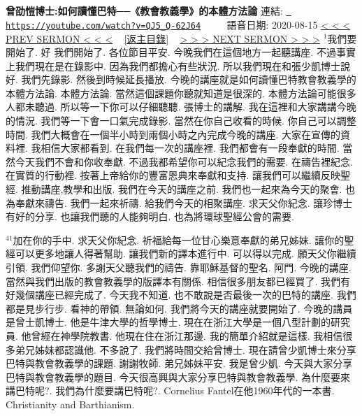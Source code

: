 \documentclass{book}
\begin{document}
\section{}
\label{sec:QJ5_Q_62J64}
\textbf{曾劭愷博士:如何讀懂巴特──《教會教義學》的本體方法論}
\newline
\newline
連結: \href{https://youtube.com/watch?v=QJ5_Q-62J64}{\texttt{ https://youtube.com/watch?v=QJ5\_Q-62J64}} ~~~~ 語音日期: 2020-08-15 
\newline
\newline
\hyperref[sec:f7PBJM5qt9k]{\small{< < < PREV SERMON < < <}}
~
\hyperref[sec:index]{\small{[返主目錄]}}
~
\hyperref[sec:O6ul_iQf2j0]{\small{> > > NEXT SERMON > > >}}
\newline
\newline
$^{1}$我們要開始了.
好 我們開始了.
各位節目平安.
今晚我們在這個地方一起聽講座.
不過事實上我們現在是在錄影中.
因為我們都擔心有些狀況.
所以我們現在和張少凱博士說好.
我們先錄影.
然後到時候延長播放.
今晚的講座就是如何讀懂巴特教會教義學的本體方法論.
本體方法論.
當然這個課題你聽就知道是很深的.
本體方法論可能很多人都未聽過.
所以等一下你可以仔細聽聽.
張博士的講解.
我在這裡和大家講講今晚的情況.
我們等一下會一口氣完成錄影.
當然在你自己收看的時候.
你自己可以調整時間.
我們大概會在一個半小時到兩個小時之內完成今晚的講座.
大家在宣傳的資料裡.
我相信大家都看到.
在我們每一次的講座裡.
我們都會有一段奉獻的時間.
當然今天我們不會和你收奉獻.
不過我都希望你可以紀念我們的需要.
在禱告裡紀念.
在實質的行動裡.
按著上帝給你的豐富恩典來奉獻和支持.
讓我們可以繼續反映聖經.
推動講座,教學和出版.
我們在今天的講座之前.
我們也一起來為今天的聚會.
也為奉獻來禱告.
我們一起來祈禱.
給我們今天的相聚講座.
求天父你紀念.
讓珍博士有好的分享.
也讓我們聽的人能夠明白.
也為將環球聖經公會的需要.

$^{41}$加在你的手中.
求天父你紀念.
祈福給每一位甘心樂意奉獻的弟兄姊妹.
讓你的聖經可以更多地讓人得著幫助.
讓我們新的譯本進行中.
可以得以完成.
願天父你繼續引領.
我們仰望你.
多謝天父聽我們的禱告.
靠耶穌基督的聖名.
阿門.
今晚的講座.
當然與我們出版的教會教義學的版譯本有關係.
相信很多朋友都已經買了.
我們有好幾個講座已經完成了.
今天我不知道.
也不敢說是否最後一次的巴特的講座.
我們都是見步行步.
看神的帶領.
無論如何.
我們將今天的講座就要開始了.
今晚的講員是曾士凱博士.
他是牛津大學的哲學博士.
現在在浙江大學是一個八型計劃的研究員.
他曾經在神學院教書.
他現在住在浙江那邊.
我的簡單介紹就是這樣.
我相信很多弟兄姊妹都認識他.
不多說了.
我們將時間交給曾博士.
現在請曾少凱博士來分享巴特與教會教義學的課題.
謝謝牧師.
弟兄姊妹平安.
我是曾少凱.
今天與大家分享巴特與教會教義學的題目.
今天很高興與大家分享巴特與教會教義學.
為什麼要來講巴特呢?.
我們為什麼要講巴特呢?.
Cornelius Fantel在他1960年代的一本書.
Christianity and Barthianism.
\end{document}
